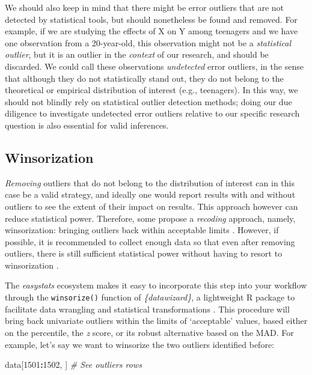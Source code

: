 \documentclass[sn-basic, lineno,pdflatex]{sn-jnl}
\newenvironment{Shaded}{\begin{snugshade}}{\end{snugshade}}
\newcommand{\CommentTok}[1]{\textcolor[rgb]{0.56,0.35,0.01}{\textit{#1}}}
\newcommand{\DecValTok}[1]{\textcolor[rgb]{0.00,0.00,0.81}{#1}}
\newcommand{\NormalTok}[1]{#1}
\newcommand{\SpecialCharTok}[1]{\textcolor[rgb]{0.81,0.36,0.00}{\textbf{#1}}}
\begin{document}
We should also keep in mind that there might be error outliers that are
not detected by statistical tools, but should nonetheless be found and
removed. For example, if we are studying the effects of X on Y among
teenagers and we have one observation from a 20-year-old, this
observation might not be a \emph{statistical outlier}, but it is an
outlier in the \emph{context} of our research, and should be discarded.
We could call these observations \emph{undetected} error outliers, in
the sense that although they do not statistically stand out, they do not
belong to the theoretical or empirical distribution of interest (e.g.,
teenagers). In this way, we should not blindly rely on statistical
outlier detection methods; doing our due diligence to investigate
undetected error outliers relative to our specific research question is
also essential for valid inferences.

\subsection{Winsorization}\label{winsorization}

\emph{Removing} outliers that do not belong to the distribution of
interest can in this case be a valid strategy, and ideally one would
report results with and without outliers to see the extent of their
impact on results. This approach however can reduce statistical power.
Therefore, some propose a \emph{recoding} approach, namely,
winsorization: bringing outliers back within acceptable limits
\citep[e.g., 3 MADs,][]{tukey1963less}. However, if possible, it is
recommended to collect enough data so that even after removing outliers,
there is still sufficient statistical power without having to resort to
winsorization \citep{leys2019outliers}.

The \emph{easystats} ecosystem makes it easy to incorporate this step
into your workflow through the \texttt{winsorize()} function of
\emph{\{datawizard\}}, a lightweight R package to facilitate data
wrangling and statistical transformations \citep{patil2022datawizard}.
This procedure will bring back univariate outliers within the limits of
`acceptable' values, based either on the percentile, the \emph{z} score,
or its robust alternative based on the MAD. For example, let's say we
want to winsorize the two outliers identified before:

\begin{Shaded}
\begin{Highlighting}[]
\NormalTok{data[}\DecValTok{1501}\SpecialCharTok{:}\DecValTok{1502}\NormalTok{, ]  }\CommentTok{\# See outliers rows}
\end{Highlighting}
\end{Shaded}
\end{document}

